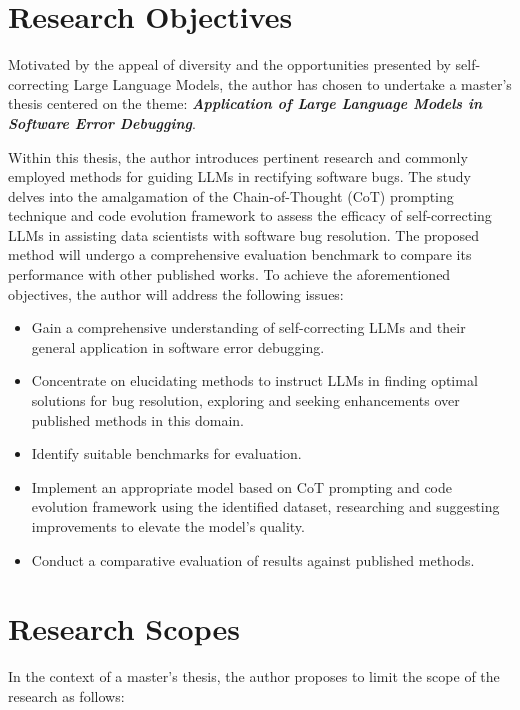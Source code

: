 \documentclass[a4paper,oneside]{book}
\begin{document}
\section{Research Objectives}
Motivated by the appeal of diversity and the opportunities presented by self-correcting Large Language Models, the author has chosen to undertake a master's thesis centered on the theme: \textbf{\textit{Application of Large Language Models in Software Error Debugging}}.

Within this thesis, the author introduces pertinent research and commonly employed methods for guiding LLMs in rectifying software bugs. The study delves into the amalgamation of the Chain-of-Thought (CoT) prompting technique and code evolution framework to assess the efficacy of self-correcting LLMs in assisting data scientists with software bug resolution. The proposed method will undergo a comprehensive evaluation benchmark to compare its performance with other published works. To achieve the aforementioned objectives, the author will address the following issues:

\begin{itemize}
    \item Gain a comprehensive understanding of self-correcting LLMs and their general application in software error debugging.

    \item Concentrate on elucidating methods to instruct LLMs in finding optimal solutions for bug resolution, exploring and seeking enhancements over published methods in this domain.

    \item Identify suitable benchmarks for evaluation.

    \item Implement an appropriate model based on CoT prompting and code evolution framework using the identified dataset, researching and suggesting improvements to elevate the model's quality.

    \item Conduct a comparative evaluation of results against published methods.
\end{itemize}

\section{Research Scopes}
In the context of a master's thesis, the author proposes to limit the scope of the research as follows:
\end{document}
